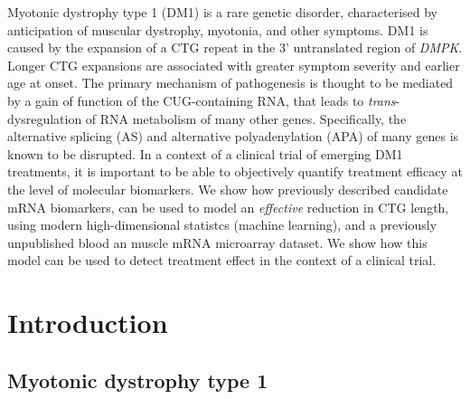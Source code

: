 \documentclass[10pt,letterpaper]{article}
\begin{document}
Myotonic dystrophy type 1 (DM1) is a rare genetic disorder, characterised by anticipation of muscular dystrophy, myotonia, and other symptoms. DM1 is caused by the expansion of a CTG repeat in the 3' untranslated region of {\it DMPK}. Longer CTG expansions are associated with greater symptom severity and earlier age at onset. The primary mechanism of pathogenesis is thought to be mediated by a gain of function of the CUG-containing RNA, that leads to {\it trans}-dysregulation of RNA metabolism of many other genes. Specifically, the alternative splicing (AS) and alternative polyadenylation (APA) of many genes is known to be disrupted. In a context of a clinical trial of emerging DM1 treatments, it is important to be able to objectively quantify treatment efficacy at the level of molecular biomarkers. We show how previously described candidate mRNA biomarkers, can be used to model an {\it effective} reduction in CTG length, using modern high-dimensional statistcs (machine learning), and a previously unpublished blood an muscle mRNA microarray dataset. We show how this model can be used to detect treatment effect in the context of a clinical trial.


\linenumbers

\section*{Introduction}

\subsection*{Myotonic dystrophy type 1}
\end{document}
